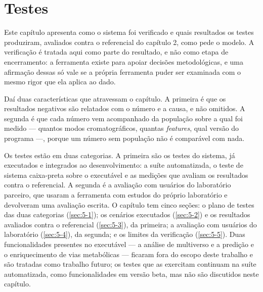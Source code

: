 
\begingroup\setlength{\emergencystretch}{3em}

\chapter{Testes}\label{cap:testes}

Este capítulo apresenta como o sistema foi verificado e quais resultados os testes produziram, avaliados contra o referencial do capítulo 2, como pede o modelo. A verificação é tratada aqui como parte do resultado, e não como etapa de encerramento: a ferramenta existe para apoiar decisões metodológicas, e uma afirmação dessas só vale se a própria ferramenta puder ser examinada com o mesmo rigor que ela aplica ao dado.

Daí duas características que atravessam o capítulo. A primeira é que os resultados negativos são relatados com o número e a causa, e não omitidos. A segunda é que cada número vem acompanhado da população sobre a qual foi medido --- quantos modos cromatográficos, quantas \textit{features}, qual versão do programa ---, porque um número sem população não é comparável com nada.

Os testes estão em duas categorias. A primeira são os testes do sistema, já executados e integrados ao desenvolvimento: a suíte automatizada, o teste de sistema caixa-preta sobre o executável e as medições que avaliam os resultados contra o referencial. A segunda é a avaliação com usuários do laboratório parceiro, que usaram a ferramenta com estudos do próprio laboratório e devolveram uma avaliação escrita. O capítulo tem cinco seções: o plano de testes das duas categorias (\ref{sec:5-1}); os cenários executados (\ref{sec:5-2}) e os resultados avaliados contra o referencial (\ref{sec:5-3}), da primeira; a avaliação com usuários do laboratório (\ref{sec:5-4}), da segunda; e os limites da verificação (\ref{sec:5-5}). Duas funcionalidades presentes no executável --- a análise de multiverso e a predição e o enriquecimento de vias metabólicas --- ficaram fora do escopo deste trabalho e são tratadas como trabalho futuro; os testes que as exercitam continuam na suíte automatizada, como funcionalidades em versão beta, mas não são discutidos neste capítulo.

